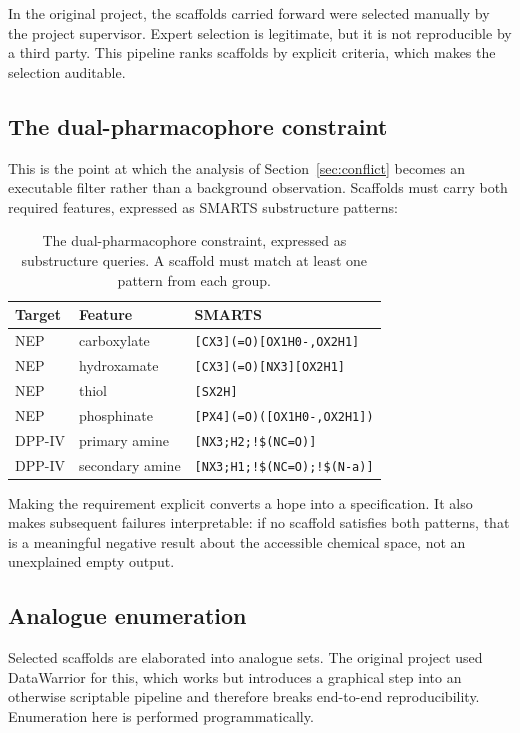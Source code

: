 \documentclass[11pt,a4paper]{article}
\begin{document}
In the original project, the scaffolds carried forward were selected manually by
the project supervisor. Expert selection is legitimate, but it is not
reproducible by a third party. This pipeline ranks scaffolds by explicit
criteria, which makes the selection auditable.

\subsection{The dual-pharmacophore constraint}

This is the point at which the analysis of Section~\ref{sec:conflict} becomes an
executable filter rather than a background observation. Scaffolds must carry
both required features, expressed as SMARTS substructure patterns:

\begin{table}[htbp]
\centering
\small
\caption{The dual-pharmacophore constraint, expressed as substructure queries.
A scaffold must match at least one pattern from each group.}
\begin{tabular}{llp{6.6cm}}
\toprule
\textbf{Target} & \textbf{Feature} & \textbf{SMARTS} \\
\midrule
NEP & carboxylate & \texttt{[CX3](=O)[OX1H0-,OX2H1]} \\
NEP & hydroxamate & \texttt{[CX3](=O)[NX3][OX2H1]} \\
NEP & thiol & \texttt{[SX2H]} \\
NEP & phosphinate & \texttt{[PX4](=O)([OX1H0-,OX2H1])} \\
\midrule
DPP-IV & primary amine & \texttt{[NX3;H2;!\$(NC=O)]} \\
DPP-IV & secondary amine & \texttt{[NX3;H1;!\$(NC=O);!\$(N-a)]} \\
\bottomrule
\end{tabular}
\end{table}

Making the requirement explicit converts a hope into a specification. It also
makes subsequent failures interpretable: if no scaffold satisfies both patterns,
that is a meaningful negative result about the accessible chemical space, not an
unexplained empty output.

\subsection{Analogue enumeration}

Selected scaffolds are elaborated into analogue sets. The original project used
DataWarrior for this, which works but introduces a graphical step into an
otherwise scriptable pipeline and therefore breaks end-to-end reproducibility.
Enumeration here is performed programmatically.
\end{document}
